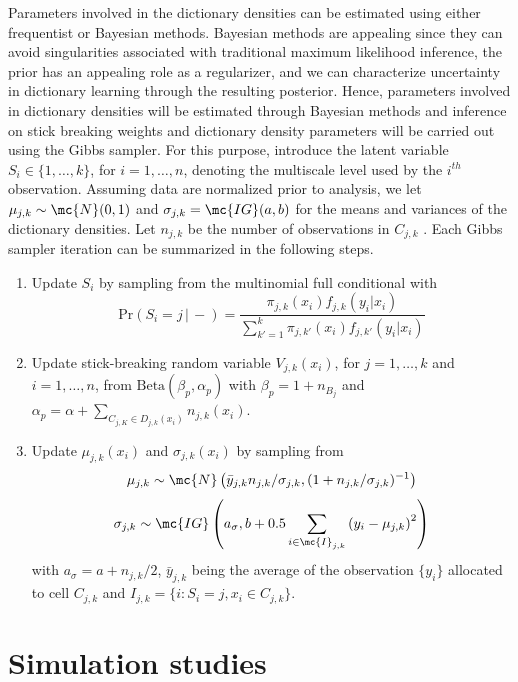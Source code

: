 Parameters involved in the dictionary densities can be estimated using either frequentist or Bayesian methods. Bayesian methods are appealing since they can avoid singularities associated with traditional maximum likelihood inference, the prior has an appealing role as a regularizer, and we can characterize uncertainty in dictionary learning through the resulting posterior.
Hence, parameters involved in dictionary densities will be estimated through Bayesian methods and inference on stick breaking weights and dictionary density parameters will be carried out using the Gibbs sampler. For this purpose, introduce the latent variable $S_i \in \{1,\ldots,k\}$, for $i=1,\ldots,n$, denoting the multiscale level used by the $i^{th}$ observation.  Assuming data are normalized prior to analysis, we let $\mu_{j,k} \sim \mc{N}(0,1)$ and $\sigma_{j,k}=\mc{IG}(a,b)$ for the means and variances of the dictionary densities. Let $n_{j,k}$ be  the number of observations in $C_{j,k}$ . Each Gibbs sampler iteration can be summarized in the following steps.
\begin{enumerate}
\item Update $S_i$ by sampling from the multinomial full conditional with 
 \[\mbox{Pr}( S_i = j\, |\, -) = \frac{ \pi_{j,k}(x_i)f_{j,k}(y_i|x_i) }{ \sum_{k'=1}^k \pi_{j,k'}(x_i)f_{j,k'}(y_i | x_i) } \label{eq:prS}\]

\item Update stick-breaking random variable $V_{j,k}(x_i)$, for $j=1, \ldots, k$ and $i=1, \ldots, n$, from $\mbox{Beta}(\beta_p,\alpha_p)$ with $\beta_p=1+n_{B_j}$ and $\alpha_p=\alpha+\sum_{C_{j,K} \in D_{j,k}(x_i)} n_{j,k}(x_i)$.

\item Update $\mu_{j,k}(x_i)$ and $\sigma_{j,k}(x_i)$ by sampling from
\[  \mu_{j,k} \sim \mc{N}\left(\bar{y}_{j,k} n_{j,k}/\sigma_{j,k},(1+n_{j,k}/\sigma_{j,k})^{-1}\right)\]
\[ \sigma_{j,k} \sim \mc{IG}\left(a_{\sigma},b+0.5\sum_{i \in \mc{I}_{j,k}} \left(y_{i}-\mu_{j,k}\right)^2\right)\]
with $a_{\sigma}=a+n_{j,k}/2$, $\bar{y}_{j,k}$ being the average of the observation $\{y_i\}$ allocated to cell $C_{j,k}$ and $I_{j,k}=\{i : S_i=j, x_i \in C_{j,k}\}$.

\end{enumerate}


\section{Simulation studies}\label{section:simulation}

